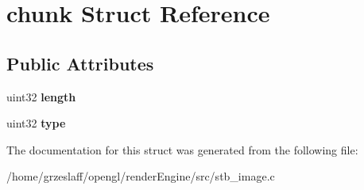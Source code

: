 \hypertarget{structchunk}{\section{chunk Struct Reference}
\label{structchunk}
}
\subsection*{Public Attributes}
\begin{DoxyCompactItemize}
\item 
\hypertarget{structchunk_a0b5cc0c5a9b91945c42373db2a499fb1}{uint32 {\bfseries length}}\label{structchunk_a0b5cc0c5a9b91945c42373db2a499fb1}

\item 
\hypertarget{structchunk_a05d5489f3807bc7ba149c1904241d087}{uint32 {\bfseries type}}\label{structchunk_a05d5489f3807bc7ba149c1904241d087}

\end{DoxyCompactItemize}


The documentation for this struct was generated from the following file\-:\begin{DoxyCompactItemize}
\item 
/home/grzeslaff/opengl/render\-Engine/src/stb\-\_\-image.\-c\end{DoxyCompactItemize}
